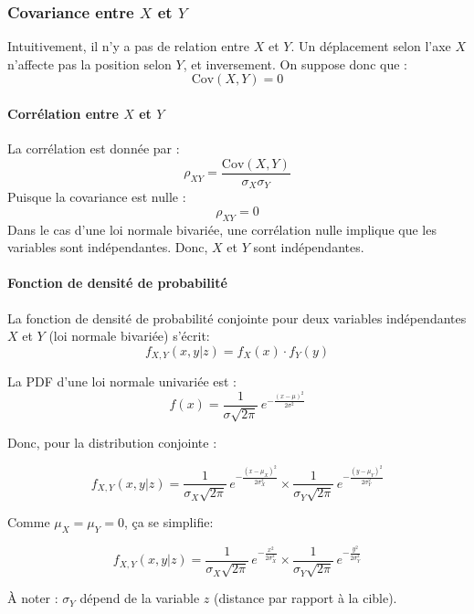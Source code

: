     \subsubsection{\texorpdfstring{Covariance entre \(X\) et
\(Y\)}{Covariance entre X et Y}}\label{covariance-entre-x-et-y}

Intuitivement, il n'y a pas de relation entre \(X\) et \(Y\). Un
déplacement selon l'axe \(X\) n'affecte pas la position selon \(Y\), et
inversement. On suppose donc que : \[
\mathrm{Cov}(X,Y) = 0
\]

\paragraph{\texorpdfstring{Corrélation entre \(X\) et
\(Y\)}{Corrélation entre X et Y}}\label{corruxe9lation-entre-x-et-y}

La corrélation est donnée par : \[
\rho_{XY}=\frac{\mathrm{Cov}(X,Y)}{\sigma_X \sigma_Y}
\] Puisque la covariance est nulle : \[
\rho_{XY} = 0
\] Dans le cas d'une loi normale bivariée, une corrélation nulle
implique que les variables sont indépendantes. Donc, \(X\) et \(Y\) sont
indépendantes.

\paragraph{Fonction de densité de
probabilité}\label{fonction-de-densituxe9-de-probabilituxe9}

La fonction de densité de probabilité conjointe pour deux variables
indépendantes \(X\) et \(Y\) (loi normale bivariée) s'écrit: \[
f_{X,Y}(x,y|z) = f_X(x) \cdot f_Y(y)
\]

La PDF d'une loi normale univariée est : \[
f(x) = \frac{1}{\sigma \sqrt{2\pi}} \, e^{-\frac{(x-\mu)^2}{2\sigma^2}}
\]

Donc, pour la distribution conjointe :

\[
f_{X,Y}(x,y|z) =
\frac{1}{\sigma_X \sqrt{2\pi}} \, e^{-\frac{(x-\mu_X)^2}{2\sigma_X^2}}
\times
\frac{1}{\sigma_Y \sqrt{2\pi}} \, e^{-\frac{(y-\mu_Y)^2}{2\sigma_Y^2}}
\]

Comme \(\mu_X = \mu_Y = 0\), ça se simplifie:

\[
f_{X,Y}(x,y|z) =
\frac{1}{\sigma_X \sqrt{2\pi}} \, e^{-\frac{x^2}{2\sigma_X^2}}
\times
\frac{1}{\sigma_Y \sqrt{2\pi}} \, e^{-\frac{y^2}{2\sigma_Y^2}}
\]

À noter : \(\sigma_Y\) dépend de la variable \(z\) (distance par rapport
à la cible).

